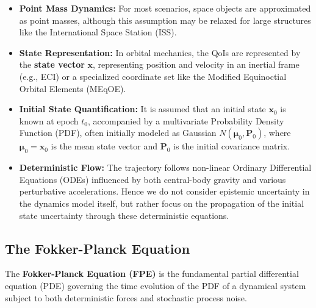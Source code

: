 \documentclass[
  letterpaper,
  DIV=11,
  numbers=noendperiod,
  oneside]{scrartcl}
\begin{document}
\begin{itemize}
\item
  \textbf{Point Mass Dynamics:} For most scenarios, space objects are
  approximated as point masses, although this assumption may be relaxed
  for large structures like the International Space Station (ISS).
\item
  \textbf{State Representation:} In orbital mechanics, the QoIs are
  represented by the \textbf{state vector} \(\mathbf{x}\), representing
  position and velocity in an inertial frame (e.g., ECI) or a
  specialized coordinate set like the Modified Equinoctial Orbital
  Elements (MEqOE).
\item
  \textbf{Initial State Quantification:} It is assumed that an initial
  state \(\mathbf{x}_0\) is known at epoch \(t_0\), accompanied by a
  multivariate Probability Density Function (PDF), often initially
  modeled as Gaussian \(N(\boldsymbol{\mu}_0, \mathbf{P}_0)\), where
  \(\boldsymbol{\mu}_0=\mathbf{x}_0\) is the mean state vector and
  \(\mathbf{P}_0\) is the initial covariance matrix.
\item
  \textbf{Deterministic Flow:} The trajectory follows non-linear
  Ordinary Differential Equations (ODEs) influenced by both central-body
  gravity and various perturbative accelerations. Hence we do not
  consider epistemic uncertainty in the dynamics model itself, but
  rather focus on the propagation of the initial state uncertainty
  through these deterministic equations.
\end{itemize}

\subsection{The Fokker-Planck
Equation}\label{the-fokker-planck-equation}

The \textbf{Fokker-Planck Equation (FPE)} is the fundamental partial
differential equation (PDE) governing the time evolution of the PDF of a
dynamical system subject to both deterministic forces and stochastic
process noise.
\end{document}

